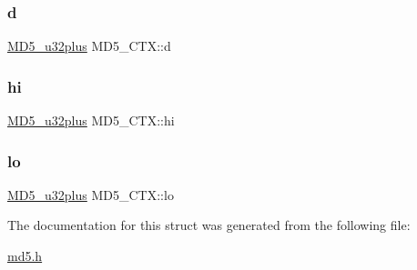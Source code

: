 \hypertarget{structMD5__CTX_a3b2316dbfcad4bdb1306dc441761f396}{}\label{structMD5__CTX_a3b2316dbfcad4bdb1306dc441761f396} 
\subsubsection{\texorpdfstring{d}{d}}
{\footnotesize\ttfamily \hyperlink{md5_8h_ad854d8865ff7e0ce3717676b84926f54}{M\+D5\+\_\+u32plus} M\+D5\+\_\+\+C\+T\+X\+::d}

\hypertarget{structMD5__CTX_a3234f683810977ac629c2a8a05a1cc87}{}\label{structMD5__CTX_a3234f683810977ac629c2a8a05a1cc87} 
\subsubsection{\texorpdfstring{hi}{hi}}
{\footnotesize\ttfamily \hyperlink{md5_8h_ad854d8865ff7e0ce3717676b84926f54}{M\+D5\+\_\+u32plus} M\+D5\+\_\+\+C\+T\+X\+::hi}

\hypertarget{structMD5__CTX_a90437ec62a8dda787f1667061d9755fe}{}\label{structMD5__CTX_a90437ec62a8dda787f1667061d9755fe} 
\subsubsection{\texorpdfstring{lo}{lo}}
{\footnotesize\ttfamily \hyperlink{md5_8h_ad854d8865ff7e0ce3717676b84926f54}{M\+D5\+\_\+u32plus} M\+D5\+\_\+\+C\+T\+X\+::lo}



The documentation for this struct was generated from the following file\+:\begin{DoxyCompactItemize}
\item 
\hyperlink{md5_8h}{md5.\+h}\end{DoxyCompactItemize}
